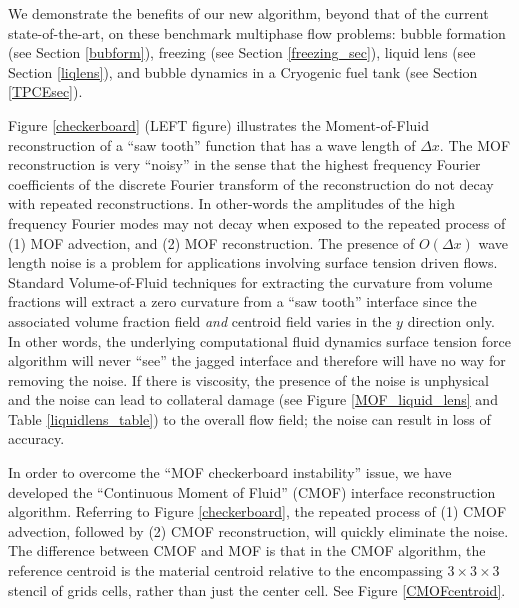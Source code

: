 \documentclass[]{article}
\begin{document}
We demonstrate the benefits of our new algorithm, beyond that of the 
current state-of-the-art, on these benchmark multiphase flow
problems:
bubble formation\cite{helsby1955behaviour} (see Section \ref{bubform}),
freezing\cite{hu2010icing} (see Section \ref{freezing_sec}), 
liquid lens\cite{MIAO2021109358} (see Section \ref{liqlens}),
and bubble dynamics in a Cryogenic fuel 
tank\cite{bentz1993low} (see Section \ref{TPCEsec}).

Figure \ref{checkerboard} (LEFT figure) 
illustrates the 
Moment-of-Fluid\cite{dyadechko2005moment,ahn2007multi,ahn2009adaptive}
reconstruction of a ``saw tooth'' function that has a wave
length of $\Delta x$.  The MOF reconstruction is very ``noisy'' in the
sense that the highest frequency
Fourier coefficients of the discrete Fourier transform
of the reconstruction do not decay with repeated reconstructions.
In other-words the amplitudes of the high frequency Fourier modes may
not decay when exposed to the repeated process of
(1) MOF advection, and (2) MOF reconstruction.
The presence of $O(\Delta x)$ wave length noise is
a problem for applications involving  
surface tension driven flows.  Standard
Volume-of-Fluid techniques for extracting the curvature
from volume fractions\cite{sussman2003second,cummins2005estimating}
will extract a zero curvature from a ``saw tooth'' interface 
since the associated volume fraction field {\em and} centroid
field varies in the $y$
direction only.  In other words, the
underlying computational fluid dynamics surface tension force
algorithm will never ``see'' the jagged interface and therefore will have
no way for removing the noise.  If there is viscosity, the presence of the 
noise is unphysical and the noise can lead to collateral damage (see Figure 
\ref{MOF_liquid_lens} and Table \ref{liquidlens_table}) 
to the overall flow field; the noise can
result in loss of accuracy.

In order to overcome the ``MOF checkerboard instability'' issue, we have 
developed the ``Continuous Moment of Fluid'' (CMOF) interface reconstruction
algorithm\cite{VAHAB2021}.  
Referring to Figure \ref{checkerboard}, the repeated process
of (1) CMOF advection, followed by (2) CMOF reconstruction, 
will quickly eliminate the
noise.  The difference between CMOF and MOF is that in the CMOF algorithm,
the reference centroid is the material centroid relative to the 
encompassing $3\times 3\times 3$ stencil of grids cells, rather than just the
center cell.  See Figure \ref{CMOFcentroid}.   
\end{document}
